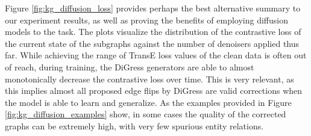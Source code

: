 Figure \ref{fig:kg_diffusion_loss} provides perhaps the best alternative summary to our experiment results, as well as proving the benefits of employing diffusion models to the task. The plots visualize the distribution of the contrastive loss of the current state of the subgraphs against the number of denoisers applied thus far. While achieving the range of TransE loss values of the clean data is often out of reach, during training, the DiGress generators are able to almost monotonically decrease the contrastive loss over time. This is very relevant, as this implies almost all proposed edge flips by DiGress are valid corrections when the model is able to learn and generalize. As the examples provided in Figure \ref{fig:kg_diffusion_examples} show, in some cases the quality of the corrected graphs can be extremely high, with very few spurious entity relations.

